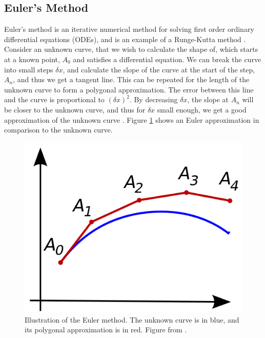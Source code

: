 \documentclass[twocolumn,prl,nobalancelastpage,aps,10pt]{revtex4-1}
\begin{document}
\subsection{Euler's Method}
Euler's method is an iterative numerical method for solving first order ordinary differential equations (ODEs), and is an example of a Runge-Kutta method \cite{Butcher2003}. Consider an unknown curve, that we wish to calculate the shape of, which starts at a known point, $A_{0}$ and satisfies a differential equation. We can break the curve into small steps $\delta x$, and calculate the slope of the curve at the start of the step, $A_{n}$, and thus we get a tangent line. This can be repeated for the length of the unknown curve to form a polygonal approximation. The error between this line and the curve is proportional to $(\delta x)^{2}$. By decreasing $\delta x$, the slope at $A_{n}$ will be closer to the unknown curve, and thus for $\delta x$ small enough, we get a good approximation of the unknown curve \cite{Butcher2003,Atkinson1989}. Figure \ref{Euler-method} shows an Euler approximation in comparison to the unknown curve.

\begin{figure}[H]
\includegraphics*[width=0.96\linewidth,clip]{Euler_method}
\caption{Illustration of the Euler method. The unknown curve is in blue, and its polygonal approximation is in red. Figure from \cite{Alexandrov2007}.}\label{Euler-method}
\end{figure}
\end{document}
